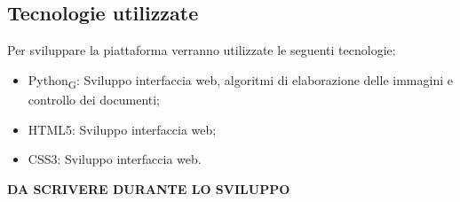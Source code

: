 \subsection{Tecnologie utilizzate}
Per sviluppare la piattaforma verranno utilizzate le seguenti tecnologie:
\begin{itemize}
    \item Python\textsubscript{G}: Sviluppo interfaccia web, algoritmi di elaborazione delle immagini e controllo dei documenti;
    \item HTML5: Sviluppo interfaccia web;
    \item CSS3: Sviluppo interfaccia web.
\end{itemize}

\textbf{DA SCRIVERE DURANTE LO SVILUPPO}
